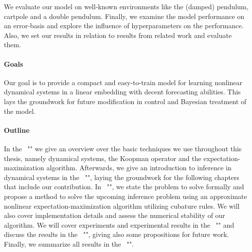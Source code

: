 	We evaluate our model on well-known environments like the (damped) pendulum, cartpole and a double pendulum. Finally, we examine the model performance on an error-basis and explore the influence of hyperparameters on the performance. Also, we set our results in relation to results from related work and evaluate them.

\paragraph{Goals}
	Our goal is to provide a compact and easy-to-train model for learning nonlinear dynamical systems in a linear embedding with decent forecasting abilities. This lays the groundwork for future modification in control and Bayesian treatment of the model.

\paragraph{Outline}
	In the \chapterautorefname~"" we give an overview over the basic techniques we use throughout this thesis, namely dynamical systems, the Koopman operator and the expectation-maximization algorithm. Afterwards, we give an introduction to inference in dynamical systems in the \chapterautorefname~"", laying the groundwork for the following chapters that include our contribution. In \chapterautorefname~"", we state the problem to solve formally and propose a method to solve the upcoming inference problem using an approximate nonlinear expectation-maximization algorithm utilizing cubature rules. We will also cover implementation details and assess the numerical stability of our algorithm. We will cover experiments and experimental results in the \chapterautorefname~"" and discuss the results in the \chapterautorefname~"", giving also some propositions for future work. Finally, we summarize all results in the \chapterautorefname~"".
